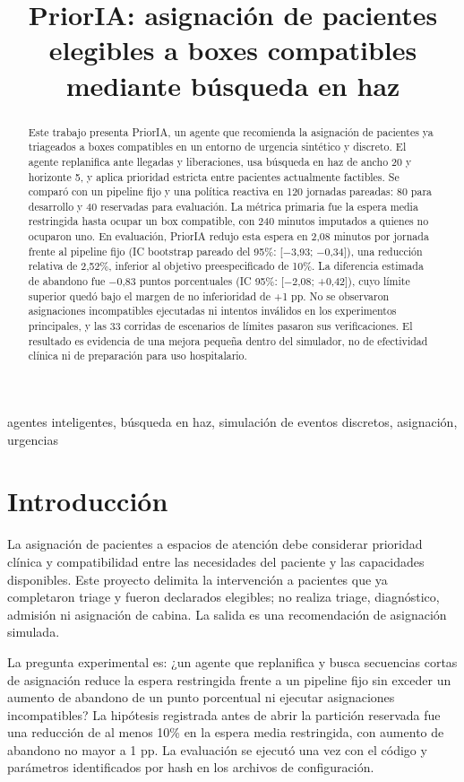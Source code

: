 \documentclass[conference]{IEEEtran}
\title{PriorIA: asignación de pacientes elegibles a boxes compatibles mediante búsqueda en haz}
\author{\IEEEauthorblockN{Jonathan Moya C.}}
\begin{document}
\maketitle

\begin{abstract}
Este trabajo presenta PriorIA, un agente que recomienda la asignación de pacientes ya triageados a boxes compatibles en un entorno de urgencia sintético y discreto. El agente replanifica ante llegadas y liberaciones, usa búsqueda en haz de ancho 20 y horizonte 5, y aplica prioridad estricta entre pacientes actualmente factibles. Se comparó con un pipeline fijo y una política reactiva en 120 jornadas pareadas: 80 para desarrollo y 40 reservadas para evaluación. La métrica primaria fue la espera media restringida hasta ocupar un box compatible, con 240 minutos imputados a quienes no ocuparon uno. En evaluación, PriorIA redujo esta espera en 2,08 minutos por jornada frente al pipeline fijo (IC bootstrap pareado del 95\%: [−3,93; −0,34]), una reducción relativa de 2,52\%, inferior al objetivo preespecificado de 10\%. La diferencia estimada de abandono fue −0,83 puntos porcentuales (IC 95\%: [−2,08; +0,42]), cuyo límite superior quedó bajo el margen de no inferioridad de +1 pp. No se observaron asignaciones incompatibles ejecutadas ni intentos inválidos en los experimentos principales, y las 33 corridas de escenarios de límites pasaron sus verificaciones. El resultado es evidencia de una mejora pequeña dentro del simulador, no de efectividad clínica ni de preparación para uso hospitalario.
\end{abstract}

\begin{IEEEkeywords}
agentes inteligentes, búsqueda en haz, simulación de eventos discretos, asignación, urgencias
\end{IEEEkeywords}

\section{Introducción}
La asignación de pacientes a espacios de atención debe considerar prioridad clínica y compatibilidad entre las necesidades del paciente y las capacidades disponibles. Este proyecto delimita la intervención a pacientes que ya completaron triage y fueron declarados elegibles; no realiza triage, diagnóstico, admisión ni asignación de cabina. La salida es una recomendación de asignación simulada.

La pregunta experimental es: ¿un agente que replanifica y busca secuencias cortas de asignación reduce la espera restringida frente a un pipeline fijo sin exceder un aumento de abandono de un punto porcentual ni ejecutar asignaciones incompatibles? La hipótesis registrada antes de abrir la partición reservada fue una reducción de al menos 10\% en la espera media restringida, con aumento de abandono no mayor a 1 pp. La evaluación se ejecutó una vez con el código y parámetros identificados por hash en los archivos de configuración.
\end{document}
